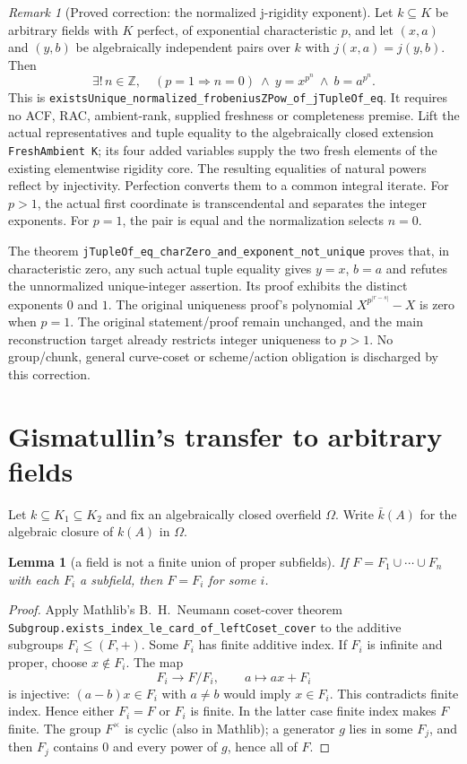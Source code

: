 \documentclass[11pt,oneside]{article}
\newtheorem{lemma}[theorem]{Lemma}
\theoremstyle{definition}
\theoremstyle{remark}
\newtheorem{remark}[theorem]{Remark}
\newcommand{\lean}[1]{\nolinkurl{#1}}
\begin{document}
\begin{remark}[Proved correction: the normalized j-rigidity exponent]
\label{rem:jrigidity-exponent-correction}
Let $k\subseteq K$ be arbitrary fields with $K$ perfect, of exponential characteristic $p$,
and let $(x,a)$ and $(y,b)$ be algebraically independent pairs over $k$ with
$j(x,a)=j(y,b)$. Then
\[
 \exists!\,n\in\mathbb Z,\quad
 (p=1\Rightarrow n=0)\ \land\ y=x^{p^n}\ \land\ b=a^{p^n}.
\]
This is \lean{existsUnique_normalized_frobeniusZPow_of_jTupleOf_eq}. It requires no ACF,
RAC, ambient-rank, supplied freshness or completeness premise. Lift the actual
representatives and tuple equality to the algebraically closed extension
\lean{FreshAmbient K}; its four added variables supply the two fresh elements of the
existing elementwise rigidity core. The resulting equalities of natural powers reflect
by injectivity. Perfection converts them to a common integral iterate. For $p>1$, the
actual first coordinate is transcendental and separates the integer exponents. For $p=1$,
the pair is equal and the normalization selects $n=0$.

The theorem \lean{jTupleOf_eq_charZero_and_exponent_not_unique} proves that, in
characteristic zero, any such actual tuple equality gives $y=x$, $b=a$ and refutes the
unnormalized unique-integer assertion. Its proof exhibits the distinct exponents $0$ and
$1$. The original uniqueness proof's polynomial $X^{p^{|r-s|}}-X$ is zero when $p=1$.
The original statement/proof remain unchanged, and the main reconstruction target already
restricts integer uniqueness to $p>1$. No group/chunk, general curve-coset or scheme/action
obligation is discharged by this correction.
\end{remark}

\section{Gismatullin's transfer to arbitrary fields}\label{sec:transfer}

Let $k\subseteq K_1\subseteq K_2$ and fix an algebraically closed overfield $\Omega$.
Write $\bar k(A)$ for the algebraic closure of $k(A)$ in $\Omega$.

\begin{lemma}[a field is not a finite union of proper subfields]\label{lem:no-field-cover}
If $F=F_1\cup\cdots\cup F_n$ with each $F_i$ a subfield, then $F=F_i$ for some $i$.
\end{lemma}
\begin{proof}
Apply Mathlib's B.~H.~Neumann coset-cover theorem
\lean{Subgroup.exists_index_le_card_of_leftCoset_cover} to the additive subgroups
$F_i\leq(F,+)$.  Some $F_i$ has finite additive index.  If $F_i$ is infinite and proper,
choose $x\notin F_i$.  The map
\[
 F_i\longrightarrow F/F_i,\qquad a\longmapsto ax+F_i
\]
is injective: $(a-b)x\in F_i$ with $a\neq b$ would imply $x\in F_i$.  This contradicts
finite index.  Hence either $F_i=F$ or $F_i$ is finite.  In the latter case finite index
makes $F$ finite.  The group $F^\times$ is cyclic (also in Mathlib); a generator $g$
lies in some $F_j$, and then $F_j$ contains $0$ and every power of $g$, hence all of $F$.
\end{proof}
\end{document}
